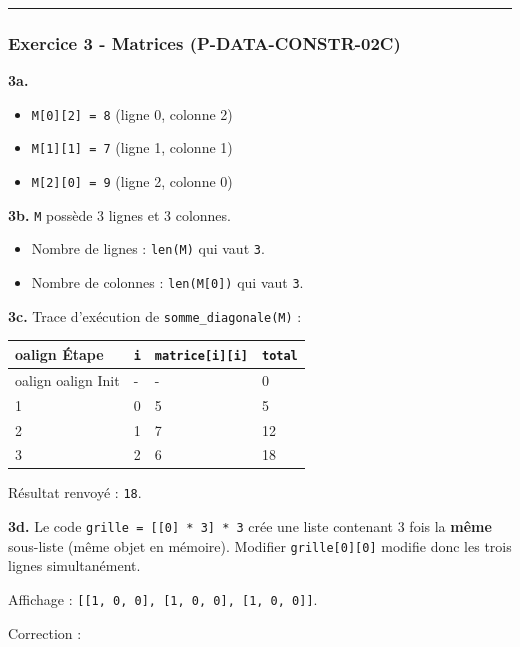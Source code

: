 \begin{center}\rule{0.5\linewidth}{0.5pt}\end{center}

\subsubsection{Exercice 3 - Matrices (P-DATA-CONSTR-02C)}

\textbf{3a.}

\begin{itemize}
\tightlist
\item
  \texttt{M{[}0{]}{[}2{]}\ =\ 8} (ligne 0, colonne 2)
\item
  \texttt{M{[}1{]}{[}1{]}\ =\ 7} (ligne 1, colonne 1)
\item
  \texttt{M{[}2{]}{[}0{]}\ =\ 9} (ligne 2, colonne 0)
\end{itemize}

\textbf{3b.} \texttt{M} possède 3 lignes et 3 colonnes.

\begin{itemize}
\tightlist
\item
  Nombre de lignes : \texttt{len(M)} qui vaut \texttt{3}.
\item
  Nombre de colonnes : \texttt{len(M{[}0{]})} qui vaut \texttt{3}.
\end{itemize}

\textbf{3c.} Trace d'exécution de \texttt{somme\_diagonale(M)} :

\begin{longtable}[]{@{}llll@{}}
\toprule
oalign{}
Étape & \texttt{i} & \texttt{matrice{[}i{]}{[}i{]}} & \texttt{total} \\
\midrule
oalign{}
\endhead
\bottomrule
oalign{}
\endlastfoot
Init & - & - & 0 \\
1 & 0 & 5 & 5 \\
2 & 1 & 7 & 12 \\
3 & 2 & 6 & 18 \\
\end{longtable}

Résultat renvoyé : \texttt{18}.

\textbf{3d.} Le code \texttt{grille\ =\ {[}{[}0{]}\ *\ 3{]}\ *\ 3} crée
une liste contenant 3 fois la \textbf{même} sous-liste (même objet en
mémoire). Modifier \texttt{grille{[}0{]}{[}0{]}} modifie donc les trois
lignes simultanément.

Affichage :
\texttt{{[}{[}1,\ 0,\ 0{]},\ {[}1,\ 0,\ 0{]},\ {[}1,\ 0,\ 0{]}{]}}.

Correction :

